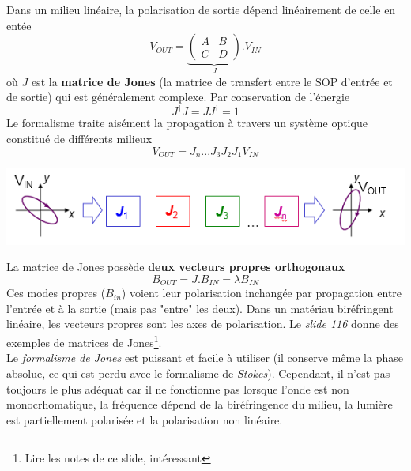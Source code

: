 	Dans un milieu linéaire, la polarisation de sortie dépend linéairement de celle en entée
	\begin{equation}
	{V_{OUT}} = \underbrace{\left( {\begin{array}{*{20}{c}}
A&B\\
C&D
\end{array}} \right)}_{J}.{V_{IN}}
	\end{equation}
	où $J$ est la \textbf{matrice de Jones} (la matrice de transfert entre le SOP d'entrée et de sortie)
	qui est généralement complexe. Par conservation de l'énergie
	\begin{equation}
	{J^\dag }J = J{J^\dag } = 1
	\end{equation}
	Le formalisme traite aisément la propagation à travers un système optique constitué de différents
	milieux
	\begin{equation}
	{V_{OUT}} = {J_n}...{J_3}{J_2}{J_1}{V_{IN}}
	\end{equation}
	\begin{center}
		\includegraphics[scale=0.74]{ch1/image42}
	\end{center}
	La matrice de Jones possède \textbf{deux vecteurs propres orthogonaux}
	\begin{equation}
	{B_{OUT}} = J.{B_{IN}} = \lambda {B_{IN}}
	\end{equation}
	Ces modes propres ($B_{in}$) voient leur polarisation inchangée par propagation entre 
	l'entrée et à la sortie (mais pas "entre" les deux). Dans un matériau biréfringent linéaire, 
	les vecteurs propres sont les axes de polarisation. Le \textit{slide 116} donne des exemples
	de matrices de Jones\footnote{Lire les notes de ce slide, intéressant}.\\
	
	
	Le \textit{formalisme de Jones} est puissant et facile à utiliser (il conserve même la phase
	absolue, ce qui est perdu avec le formalisme de \textit{Stokes}). Cependant, il n'est pas
	toujours le plus adéquat car il ne fonctionne pas lorsque l'onde est non monocrhomatique, la
	fréquence dépend de la biréfringence du milieu, la lumière est partiellement polarisée et la
	polarisation non linéaire. \\
	
